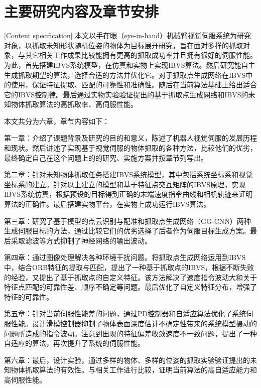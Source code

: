 \documentclass[fontset=fandol,type=bachelor,campus=harbin,bsmainpagenumberline=true]{hithesisbook}
\begin{document}
\newpage
\section{主要研究内容及章节安排}[Content specification]
本文以手在眼（eye-in-hand）机械臂视觉伺服系统为研究对象，以抓取未知形状随机位姿的物体为目标展开研究，旨在面对多样的抓取对象，与其它相关工作成果比较能拥有更高的抓取成功率并且拥有很好的伺服性能。为此，首先搭建IBVS系统模型，在仿真和实物上实现IBVS算法。然后研究能自主生成抓取期望的算法，选择合适的方法并优化它。对于抓取点生成网络在IBVS中的使用，保证特征提取、匹配的可靠性和准确性。随后在当前算法基础上给出适合它的IBVS控制律。最后通过实物实验验证提出的基于抓取点生成网络和IBVS的未知物体抓取算法的高抓取率、高伺服性能。

本文共分为六章，章节内容如下：

 
第一章：介绍了课题背景及研究的目的和意义，陈述了机器人视觉伺服的发展历程和现状。然后讲述了实现基于视觉伺服的物体抓取的各种方法，比较他们的优劣，最终确定自己在这个问题上的的研究、实施方案并按章节列写出。 

 
第二章：针对未知物体抓取任务搭建IBVS系统模型，其中包括系统坐标系和视觉坐标系的建立。针对以上建立的模型和基于特征点交互矩阵的IBVS原理，实现IBVS系统仿真，根据预设的目标得到正确的末端速度指令曲线和相机轨迹来证明算法的正确性。最后搭建实物平台，在实物上成功运行IBVS算法。


第三章：研究了基于模型的点云识别与配准和抓取点生成网络（GG-CNN）两种生成伺服目标的方法，通过比较它们的优劣选择了后者作为伺服目标生成方案。最后采取滤波等方式抑制了神经网络的输出波动。


第四章：通过图像处理解决各种环境干扰问题。将抓取点生成网络运用到IBVS中，结合ORB特征的提取与匹配，提出了一种基于抓取点的IBVS，根据不断失败的经验，又提出了基于抓取点的自定义特征。该方法解决了速度指令波动大和关于特征点匹配的可靠性差、顺序不确定等问题。最后优化了自定义特征分布，增强了特征的可靠性。


第五章：针对当前伺服性能差的问题，通过PD控制器和自适应算法优化了系统伺服性能。设计滑模控制器抑制了物体表面深度估计不确定性带来的系统模型摄动的问题所造成的指令波动。注意到出现的特征偏差收敛速度不一致问题，提出了一种自适应的算法，再次提升了系统的伺服性能。


第六章：最后，设计实验，通过多样的物体、多样的位姿的抓取实验验证提出的未知物体抓取算法的有效性。与相关工作进行比较，证明当前算法的高自适应能力和高伺服性能。
\end{document}
